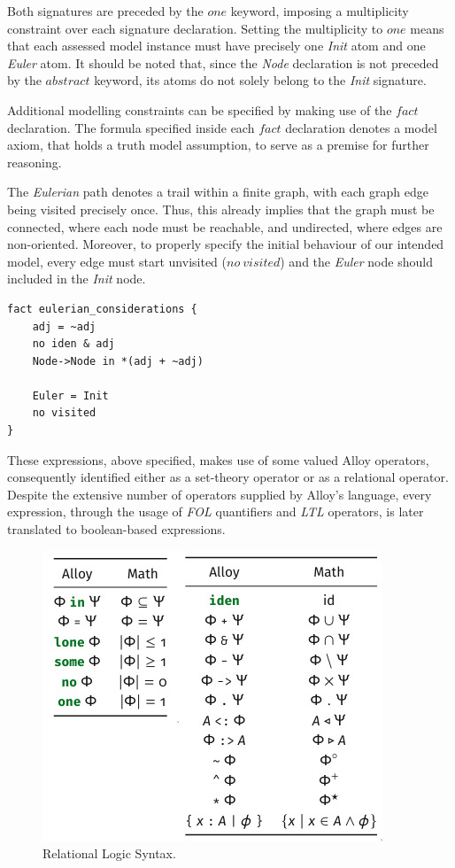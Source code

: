 Both signatures are preceded by the $one$ keyword, imposing a multiplicity constraint over each signature declaration. Setting the multiplicity to $one$ means that each assessed model instance must have precisely one \textit{Init} atom and one \textit{Euler} atom. It should be noted that, since the \textit{Node} declaration is not preceded by the $abstract$ keyword, its atoms do not solely belong to the \textit{Init} signature. 

Additional modelling constraints can be specified by making use of the $fact$ declaration. The formula specified inside each $fact$ declaration denotes a model axiom, that holds a truth model assumption, to serve as a premise for further reasoning. 

The \textit{Eulerian} path denotes a trail within a finite graph, with each graph edge being visited precisely once. Thus, this already implies that the graph must be connected, where each node must be reachable, and undirected, where edges are non-oriented. Moreover, to properly specify the initial behaviour of our intended model, every edge must start unvisited ($no\ visited$) and the \textit{Euler} node should included in the \textit{Init} node. 

\begin{lstlisting}[title={Graph restrictions through $fact$ declaration.}, otherkeywords = {abstract, sig, module, set, fact, iden, no, in, \=, \*, \+, \~, \-\>, \&}, floatplacement=H]
fact eulerian_considerations {
    adj = ~adj
    no iden & adj
    Node->Node in *(adj + ~adj)
    
    Euler = Init
    no visited
}
\end{lstlisting}

These expressions, above specified, makes use of some valued Alloy operators, consequently identified either as a set-theory operator or as a relational operator. Despite the extensive number of operators supplied by Alloy's language, every expression, through the usage of \textit{FOL} quantifiers and \textit{LTL} operators, is later translated to boolean-based expressions. 

\begin{figure}[H]
    \centering
    \includegraphics[width=0.5\linewidth]{images/alloy_relational_logic.jpg}
    \caption{Relational Logic Syntax.}
    \label{fig:alloy-rel}
\end{figure}

